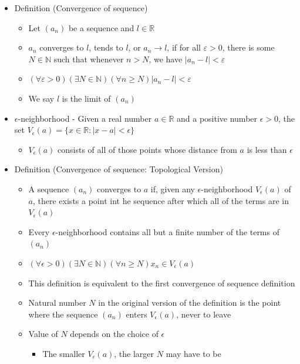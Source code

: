 \documentclass{article}
\begin{document}
\begin{itemize}
    \item Definition (Convergence of sequence)
    \begin{itemize}
        \item Let $(a_n)$ be a sequence and $l \in \mathbb{R}$
        \item $a_n$ converges to $l$, tends to $l$, or $a_n \rightarrow l$, if for all $\varepsilon > 0$, there is some $N \in \mathbb{N}$ such that whenever $n > N$, we have $\vert a_n - l \vert < \varepsilon$
        \item $(\forall \varepsilon > 0)(\exists N \in \mathbb{N})(\forall n \ge N) \vert a_n - l \vert < \varepsilon$
        \item We say $l$ is the limit of $(a_n)$
    \end{itemize}
    \item $\epsilon$-neighborhood - Given a real number $a \in \mathbb{R}$ and a positive number $\epsilon > 0$, the set $V_\epsilon(a) = \{ x \in \mathbb{R} : \vert x-a \vert < \epsilon \}$
    \begin{itemize}
        \item $V_\epsilon(a)$ consists of all of those points whose distance from $a$ is less than $\epsilon$
    \end{itemize}
    \item Definition (Convergence of sequence: Topological Version)
    \begin{itemize}
        \item A sequence $(a_n)$ converges to $a$ if, given any $\epsilon$-neighborhood $V_\epsilon(a)$ of $a$, there exists a point int he sequence after which all of the terms are in $V_\epsilon(a)$
        \item Every $\epsilon$-neighborhood contains all but a finite number of the terms of $(a_n)$
        \item $(\forall \epsilon > 0)(\exists N \in \mathbb{N})(\forall n \ge N)x_n \in V_\epsilon(a)$
        \item This definition is equivalent to the first convergence of sequence definition
        \item Natural number $N$ in the original version of the definition is the point where the sequence $(a_n)$ enters $V_\epsilon(a)$, never to leave
        \item Value of $N$ depends on the choice of $\epsilon$
        \begin{itemize}
            \item The smaller $V_\epsilon(a)$, the larger $N$ may have to be

\end{itemize}
\end{itemize}
\end{itemize}
\end{document}
